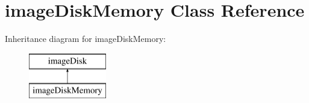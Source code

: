 \hypertarget{classimageDiskMemory}{\section{image\-Disk\-Memory Class Reference}
\label{classimageDiskMemory}
}
Inheritance diagram for image\-Disk\-Memory\-:\begin{figure}[H]
\begin{center}
\leavevmode
\includegraphics[height=2.000000cm]{classimageDiskMemory}
\end{center}
\end{figure}
